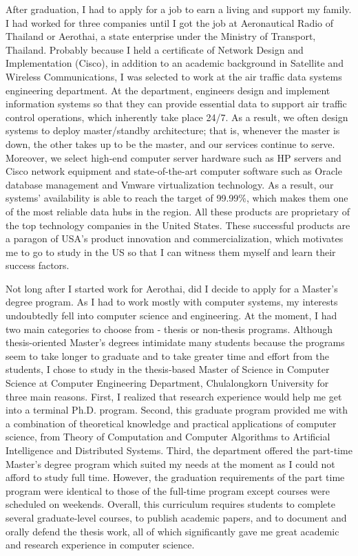 \documentclass[a4paper]{report}
\begin{document}
\vspace{0.2cm}
After graduation, I had to apply for a job to earn a living and support my family. I had worked for three companies until I got the job at Aeronautical Radio of Thailand or Aerothai, a state enterprise under the Ministry of Transport, Thailand. Probably because I held a certificate of Network Design and Implementation (Cisco), in addition to an academic background in Satellite and Wireless Communications, I was selected to work at the air traffic data systems engineering department. At the department, engineers design and implement information systems so that they can provide essential data to support air traffic control operations, which inherently take place 24/7. As a result, we often design systems to deploy master/standby architecture; that is, whenever the master is down, the other takes up to be the master, and our services continue to serve. Moreover, we select high-end computer server hardware such as HP servers and Cisco network equipment and state-of-the-art computer software such as Oracle database management and Vmware virtualization technology. As a result, our systems' availability is able to reach the target of 99.99\%, which makes them one of the most reliable data hubs in the region. All these products are proprietary of the top technology companies in the United States. These successful products are a paragon of USA's product innovation and commercialization, which motivates me to go to study in the US so that I can witness them myself and learn their success factors.

\vspace{0.2cm}
Not long after I started work for Aerothai, did I decide to apply for a Master's degree program. As I had to work mostly with computer systems, my interests undoubtedly fell into computer science and engineering.  At the moment, I had two main categories to choose from - thesis or non-thesis programs. Although thesis-oriented Master's degrees intimidate many students because the programs seem to take longer to graduate and to take greater time and effort from the students, I chose to study in the thesis-based Master of Science in Computer Science at Computer Engineering Department, Chulalongkorn University for three main reasons. First, I realized that research experience would help me get into a terminal Ph.D. program. Second, this graduate program provided me with a combination of theoretical knowledge and practical applications of computer science, from Theory of Computation and Computer Algorithms to Artificial Intelligence and Distributed Systems. Third, the department offered the part-time Master's degree program which suited my needs at the moment as I could not afford to study full time. However, the graduation requirements of the part time program were identical to those of the full-time program except courses were scheduled on weekends. Overall, this curriculum requires students to complete several graduate-level courses, to publish academic papers, and to document and orally defend the thesis work, all of which significantly gave me great academic and research experience in computer science.
\end{document}
